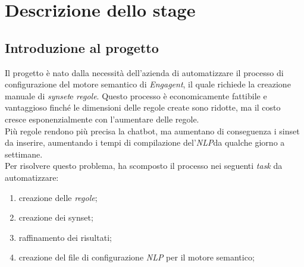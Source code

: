 
\chapter{Descrizione dello stage}
\label{cap:descrizione-stage}

\section{Introduzione al progetto}\label{sec:progetto}

Il progetto è nato dalla necessità dell'azienda \company di automatizzare il processo di configurazione del motore semantico di \emph{Engagent}\glsfirstoccur, il quale richiede la creazione manuale di \emph{synset}\glsfirstoccur e \emph{regole}\glsfirstoccur. Questo processo è economicamente fattibile e vantaggioso finché le dimensioni delle regole create sono ridotte, ma il costo cresce esponenzialmente con l'aumentare delle regole.\\
Più regole rendono più precisa la chatbot, ma aumentano di conseguenza i sinset da inserire, aumentando i tempi di compilazione del'\emph{NLP}\glsfirstoccur da qualche giorno a settimane.\\
Per risolvere questo problema, \company ha scomposto il processo nei seguenti \textit{task} da automatizzare:
\begin{enumerate}
    \item creazione delle \emph{regole}\glsfirstoccur;
    \item creazione dei synset;
    \item raffinamento dei risultati;
    \item creazione del file di configurazione \emph{NLP} per il motore semantico;
\end{enumerate}

